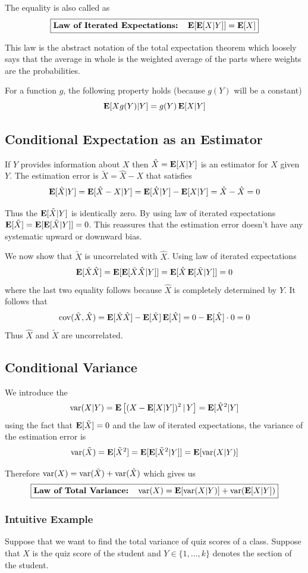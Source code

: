  The equality is also called as 
 \[\boxed{ \textbf{Law of Iterated Expectations:} \quad \operatorname{\textbf{E}}[\operatorname{\textbf{E}}[X|Y]]=\operatorname{\textbf{E}}[X] }\]

 This law is the abstract notation of the total expectation theorem which loosely says that the average in whole is the weighted average of the parts where weights are the probabilities.
 
 For a function $g$, the following property holds (because $g(Y)$ will be a constant)
 \[\operatorname{\textbf{E}}[Xg(Y)|Y]=g(Y)\operatorname{\textbf{E}}[X|Y]\]

 \subsection{Conditional Expectation as an Estimator}
 If $Y$ provides information about $X$ then $\hat X = \operatorname{\textbf{E}}[X|Y]$ is an estimator for $X$ given $Y$. The estimation error is $\tilde X = \hat X - X$ that satisfies
 \[\operatorname{\textbf{E}}[\tilde X | Y]=\operatorname{\textbf{E}}[\hat X - X |Y]=\operatorname{\textbf{E}}[\hat X|Y]-\operatorname{\textbf{E}}[X|Y]=\hat X - \hat X = 0\]

 Thus the \rv $\operatorname{\textbf{E}}[\tilde X |Y]$ is identically zero. By using law of iterated expectations $\operatorname{\textbf{E}}[\tilde X]=\operatorname{\textbf{E}}[\operatorname{\textbf{E}}[\tilde X|Y]]=0$. This reassures that the estimation error doesn't have any systematic upward or downward bias.

 We now show that $\tilde X$ is uncorrelated with $\hat X$. Using law of iterated expectations
 \[\operatorname{\textbf{E}}[\tilde X \hat X]=\operatorname{\textbf{E}}[\operatorname{\textbf{E}}[\tilde X \hat X|Y]]=\operatorname{\textbf{E}}[\hat X \operatorname{\textbf{E}}[\tilde X|Y]]=0\]
 where the last two equality follows because $\hat X$ is completely determined by $Y$. It follows that 
 \[\text{cov}(\tilde X,\hat X)=\operatorname{\textbf{E}}[\tilde X \hat X]-\operatorname{\textbf{E}}[\tilde X]\operatorname{\textbf{E}}[\hat X] = 0 - \operatorname{\textbf{E}}[\hat X] \cdot 0=0\]
 Thus $\hat X$ and $\tilde X$ are uncorrelated.

 \subsection{Conditional Variance}
 We introduce the \rv 
 \[\text{var}(X|Y)=\operatorname{\textbf{E}} \big [(X-\operatorname{\textbf{E}}[X|Y])^2 \, | \,Y \big ]=\operatorname{\textbf{E}}[\tilde X ^2 | Y]\]
 using the fact that $\operatorname{\textbf{E}}[\tilde X]=0$ and the law of iterated expectations, the variance of the estimation error is
 \[\operatorname{\text{var}}(\tilde X)=\operatorname{\textbf{E}}[\tilde X ^2]=\operatorname{\textbf{E}}[\operatorname{\textbf{E}}[\tilde X ^2|Y]]=\operatorname{\textbf{E}}[\operatorname{\text{var}}(X|Y)]\]

 Therefore $\operatorname{\text{var}}(X)=\operatorname{\text{var}}(\tilde X) + \operatorname{\text{var}}(\hat X)$ which gives us
 \[\boxed{ \textbf{Law of Total Variance:} \quad \operatorname{\text{var}}(X)=\operatorname{\textbf{E}}[\operatorname{\text{var}}(X|Y)]+\operatorname{\text{var}}(\operatorname{\textbf{E}}[X|Y])}\]

 \subsubsection{Intuitive Example}
 Suppose that we want to find the total variance of quiz scores of a class. Suppose that $X$ is the quiz score of the student and $Y\in \{1,\ldots,k\}$ denotes the section of the student.
 
